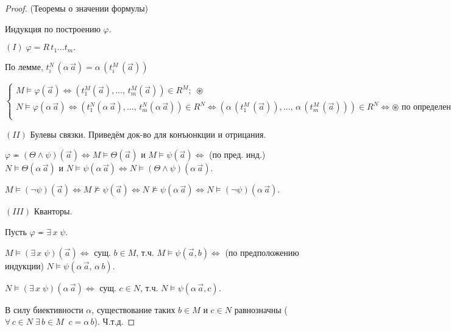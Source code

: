 \documentclass[a4paper, fleqn]{article}
\begin{document}
    \begin{proof} (Теоремы о значении формулы)
    
    Индукция по построению $\varphi.$
    
    $(I) \; \varphi = R \, t_1 \dots t_m.$
    
    По лемме, $t_i^N \, (\alpha \, \overset{\to}{a}) = \alpha \, (t_i^M \, (\overset{\to}{a}))$
    
    $\begin{cases}
    M \vDash \varphi (\overset{\to}{a}) \iff \left( t_1^M(\overset{\to}{a} ), \dots ,  \, t_m^M(\overset{\to}{a} )  \right) \in R^M; \; \circledast \\
    N \vDash \varphi (\alpha \, \overset{\to}{a}) \iff \left( t_1^N(\alpha \, \overset{\to}{a} ), \dots ,  \, t_m^N(\alpha \,  \overset{\to}{a} )  \right) \in R^N \iff \left( \alpha \, (t_1^M \, (\overset{\to}{a})), \dots ,  \, \alpha \, (t_m^M \, (\overset{\to}{a}))  \right) \in R^N \iff \circledast \text{ по определению}. \\
    \end{cases}$ 
    
    $(II)$ Булевы связки. Приведём док-во для конъюнкции и отрицания.
    
    $\varphi \eqcirc (\Theta \land \psi ) (\overset{\to}{a}) \iff M \vDash \Theta(\overset{\to}{a})$  и $ M \vDash \psi(\overset{\to}{a}) \iff$ (по пред. инд.) $N \vDash \Theta(\alpha \, \overset{\to}{ a})$  и $ N \vDash \psi(\alpha \, \overset{\to}{ a}) \iff N \vDash (\Theta \land \psi ) (\alpha \, \overset{\to}{a})$.
    
    $M \vDash (\neg \psi) (\overset{\to}{a}) \iff M \nvDash \psi (\overset{\to}{a}) \iff N \nvDash \psi (\alpha \, \overset{\to}{a}) \iff  N \vDash (\neg \psi ) (\alpha \, \overset{\to}{a}).$
    
    $(III)$ Кванторы. 
    
    Пусть $\varphi \eqcirc \exists \, x \; \psi.$
    
    $M \vDash (\exists \, x \; \psi ) (\overset{\to}{a}) \iff $ сущ. $b \in M$, т.ч. $ M \vDash \psi (\overset{\to}{a}, b) \iff$ (по предположению индукции) $N \vDash \psi (\alpha \, \overset{\to}{a}, \, \alpha \, b).$
    
    $N \vDash (\exists \, x \; \psi ) (\alpha \, \overset{\to}{a}) \iff $ сущ. $c \in N$, т.ч. $ N \vDash \psi (\alpha \, \overset{\to}{a}, c).$
    
    В силу биективности $\alpha$, существование таких $b \in M$ и $c \in N$ равнозначны ($\forall \, c \in N \; \exists \,  b \in M  \; \; c = \alpha \, b$). Ч.т.д.
    

\end{proof}
\end{document}
